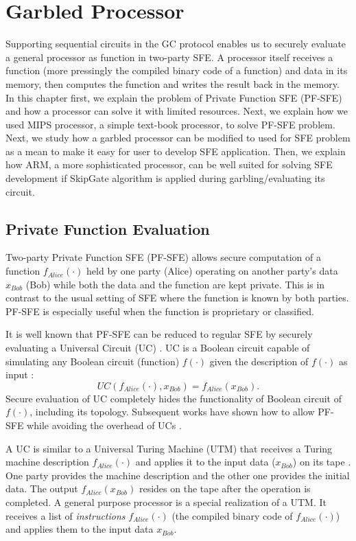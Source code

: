 \chapter{Garbled Processor}\label{chap:processor}
Supporting sequential circuits in the GC protocol enables us to securely evaluate a general processor as function in two-party SFE.
A processor itself receives a function (more pressingly the compiled binary code of a function) and data in its memory, then computes the function and writes the result back in the memory.
In this chapter first, we explain the problem of Private Function SFE (PF-SFE) and how a processor can solve it with limited resources.
Next, we explain how we used MIPS processor, a simple text-book processor, to solve PF-SFE problem.
Next, we study how a garbled processor can be modified to used for SFE problem as a mean to make it easy for user to develop SFE application.
Then, we explain how ARM, a more sophisticated processor, can be well suited for solving SFE development if SkipGate algorithm is applied during garbling/evaluating its circuit.

\section{Private Function Evaluation}\label{sec:processor-pfsfe}
Two-party Private Function SFE (PF-SFE) allows secure computation of a function $f_{Alice}(\cdot)$ held by one party (Alice) operating on another party's data $x_{Bob}$ (Bob) while both the data and the function are kept private.
This is in contrast to the usual setting of SFE where the function is known by both parties.
PF-SFE is especially useful when the function is proprietary or classified.

It is well known that PF-SFE can be reduced to regular SFE by securely evaluating a Universal Circuit (UC) \cite{sander1999non}.
UC is a Boolean circuit capable of simulating any Boolean circuit (function) $f(\cdot)$ given the description of $f(\cdot)$ as input \cite{valiant1976universal,kolesnikov2008practical}:
$$UC(f_{Alice}(\cdot),x_{Bob}) = f_{Alice}(x_{Bob}).$$
Secure evaluation of UC completely hides the functionality of Boolean circuit of $f(\cdot)$, including its topology.
Subsequent works have shown how to allow PF-SFE while avoiding the overhead of UCs \cite{katz2011constant, mohassel2013hide}.

A UC is similar to a Universal Turing Machine (UTM) \cite{turing1936computable,herken1995universal} that receives a Turing machine description $f_{Alice}(\cdot)$ and applies it to the input data ($x_{Bob}$) on its tape \cite{davis2001engines}.
One party provides the machine description and the other one provides the initial data.
The output $f_{Alice}(x_{Bob})$ resides on the tape after the operation is completed.
A general purpose processor is a special realization of a UTM.
It receives a list of \emph{instructions} $f_{Alice}(\cdot)$ (the compiled binary code of $f_{Alice}(\cdot)$) and applies them to the input data $x_{Bob}$.

